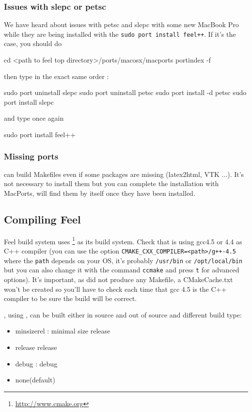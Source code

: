 \subsubsection{Issues with slepc or petsc}
We have heard about issues with petsc and slepc with some new MacBook Pro while they are being installed with the \verb|sudo port install feel++|. If it's the case, you should do
\begin{unixcom}
		cd <path to feel top directory>/ports/macosx/macports
		portindex -f
\end{unixcom}

then type in the exact same order :
\begin{unixcom}
		sudo port uninstall slepc
		sudo port uninstall petsc
		sudo port install -d petsc
		sudo port install slepc
\end{unixcom}
and type once again
\begin{unixcom}
		sudo port install feel++
\end{unixcom}

\subsubsection{Missing ports}
\cmake can build Makefiles even if some packages are missing (latex2html, VTK ...). It's not necessary to install them but you can complete the installation with MacPorts, \cmake will find them by itself once they have been installed.

\subsection{Compiling Feel}
\label{compilingfeel}
Feel build system uses \cmake{}\footnote{\url{http://www.cmake.org}}
as its build system. Check that \cmake is using gcc4.5 or 4.4 as C++ compiler
(you can use the option \verb|CMAKE_CXX_COMPILER=<path>/g++-4.5| where the
\verb|path| depends on your OS, it's probably \verb|/usr/bin| or
\verb|/opt/local/bin| but you can also change it with the command \verb|ccmake|
and press \verb|t| for advanced options).  It's important, as \cmake did
not produce any Makefile, a CMakeCache.txt won't be created so you'll have to
check each time that gcc 4.5 is the C++ compiler to be sure the build will be
correct.

\feel, using \cmake, can be built either in source and out of source and different
build type:
\begin{itemize}
\item minsizerel : minimal size release
\item release release
\item debug : debug
\item none(default)
\end{itemize}

